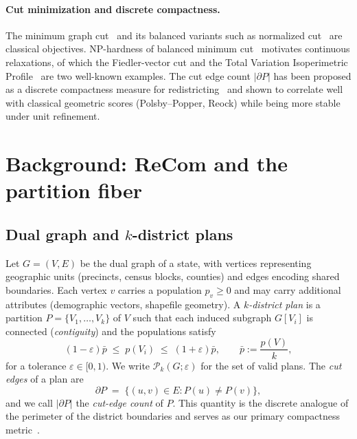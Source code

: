 \documentclass[11pt]{article}
\begin{document}
\paragraph{Cut minimization and discrete compactness.}\label{sec:related-cut}

The minimum graph cut~\cite{stoer1997simple,karger2000minimum} and its
balanced variants such as normalized cut~\cite{shi2000normalized} are
classical objectives. NP-hardness of balanced minimum
cut~\cite{wagner1993between} motivates continuous relaxations, of
which the Fiedler-vector cut and the Total Variation Isoperimetric
Profile~\cite{deford2019total} are two well-known examples. The cut
edge count $|\partial P|$ has been proposed as a discrete compactness
measure for redistricting~\cite{duchin2018discrete} and shown to
correlate well with classical geometric scores (Polsby--Popper, Reock)
while being more stable under unit refinement.

\section{Background: ReCom and the partition fiber}\label{sec:background}

\subsection{Dual graph and \texorpdfstring{$k$}{k}-district plans}\label{sec:background-graph}

Let $G = (V, E)$ be the dual graph of a state, with vertices
representing geographic units (precincts, census blocks, counties) and
edges encoding shared boundaries. Each vertex $v$ carries a population
$p_v \ge 0$ and may carry additional attributes (demographic vectors,
shapefile geometry). A \emph{$k$-district plan} is a partition
$P = \{V_1, \ldots, V_k\}$ of $V$ such that each induced subgraph
$G[V_i]$ is connected (\emph{contiguity}) and the populations satisfy
\begin{equation}\label{eq:pop-balance}
  (1 - \varepsilon)\bar p \;\le\; p(V_i) \;\le\; (1 + \varepsilon)\bar p,
  \qquad \bar p := \frac{p(V)}{k},
\end{equation}
for a tolerance $\varepsilon \in [0, 1)$. We write $\mathcal{P}_k(G; \varepsilon)$
for the set of valid plans. The \emph{cut edges} of a plan are
\[
  \partial P \;=\; \{(u,v) \in E : P(u) \ne P(v)\},
\]
and we call $|\partial P|$ the \emph{cut-edge count} of $P$. This
quantity is the discrete analogue of the perimeter of the district
boundaries and serves as our primary compactness
metric~\cite{duchin2018discrete}.
\end{document}
